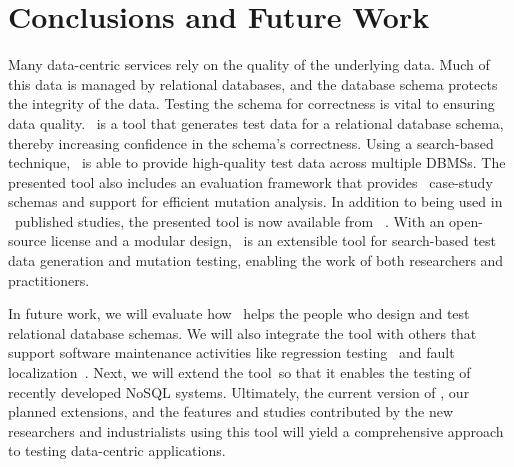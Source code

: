 \section{Conclusions and Future Work}\label{sec:conclusion}


Many data-centric services rely on the quality of the underlying data. Much of this data is managed by relational
databases, and the database schema protects the integrity of the data.  Testing the schema for correctness is vital to
ensuring data quality. \sa~is a tool that generates test data for a relational database schema, thereby increasing
confidence in the schema's correctness. Using a search-based technique, \sa~is able to provide high-quality test data
across multiple DBMSs. The presented tool also includes an evaluation framework that provides
\numprovidedschemas~case-study schemas and support for efficient mutation analysis. In addition to being used in
\numuniquepapers~published studies, the presented tool is now available from \sawebsite~\cite{tool}. With an open-source
license and a modular design, \sa~is an extensible tool for search-based test data generation and mutation testing,
enabling the work of both researchers and practitioners.


In future work, we will evaluate how \sa~helps the people who design and test relational database schemas. We will
also integrate the tool with others that support software maintenance activities like regression
testing~\cite{Kapfhammer2008} and fault localization~\cite{Clark2011}. Next, we will extend the tool~so that it enables
the testing of recently developed NoSQL systems. Ultimately, the current version of \sa, our planned extensions, and the
features and studies contributed by the new researchers and industrialists using this tool will yield a comprehensive
approach to testing data-centric applications.
